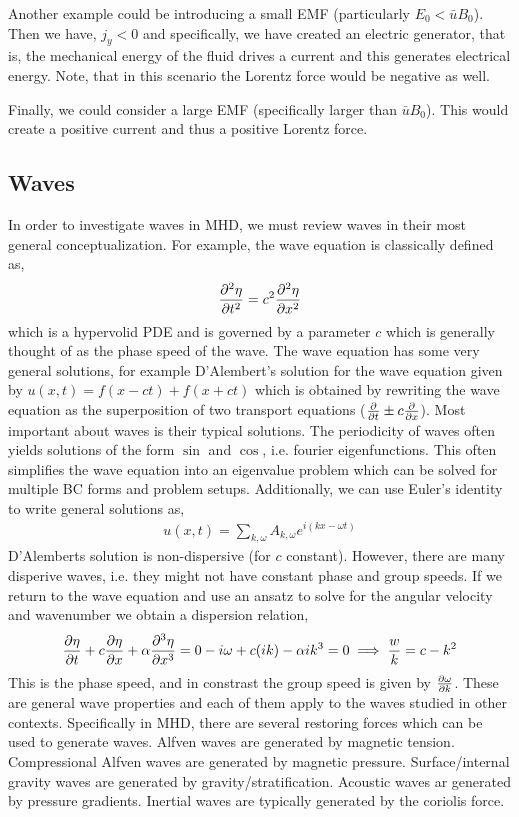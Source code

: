 \documentclass{article}
\begin{document}
Another example could be introducing a small EMF (particularly $E_0 <
\bar{u}B_0$). Then we have, $j_y < 0$ and specifically, we have created an
electric generator, that is, the mechanical energy of the fluid drives a current
and this generates electrical energy. Note, that in this scenario the Lorentz
force would be negative as well. 

Finally, we could consider a large EMF (specifically larger than $\bar{u}B_0$).
This would create a positive current and thus a positive Lorentz force. 

\subsection{Waves}
In order to investigate waves in MHD, we must review waves in their most general
conceptualization. For example, the wave equation is classically defined as, 
\begin{gather*}
    \frac{\partial^2 \eta}{\partial t^2} = c^2\frac{\partial^2 \eta}{\partial x^2}
\end{gather*}
which is a hypervolid PDE and is governed by a parameter $c$ which is generally
thought of as the phase speed of the wave. The wave equation has some very
general solutions, for example D'Alembert's solution for the wave equation given
by $u(x,t) = f(x-ct) + f(x + ct)$ which is obtained by rewriting the wave
equation as the superposition of two transport equations ($\frac{\partial }{\partial t} \pm c\frac{\partial }{\partial x}$).
Most important about waves is their typical solutions. The periodicity of waves
often yields solutions of the form $\sin$ and $\cos$, i.e. fourier
eigenfunctions. This often simplifies the wave equation into an eigenvalue
problem which can be solved for multiple BC forms and problem setups.
Additionally, we can use Euler's identity to write general solutions as, 
\begin{gather*}
    u(x,t) = \sum_{k,\omega} A_{k,\omega}e^{i(kx - \omega t)}
\end{gather*}
D'Alemberts solution is non-dispersive (for $c$ constant). However, there are
many disperive waves, i.e. they might not have constant phase and group speeds.
If we return to the wave equation and use an ansatz to solve for the angular
velocity and wavenumber we obtain a dispersion relation, 
\begin{gather*}
    \frac{\partial \eta}{\partial t} + c\frac{\partial \eta}{\partial x} +\alpha\frac{\partial ^3\eta}{\partial x^3} = 0
    -i\omega + c(ik) - \alpha ik^3 = 0 \implies \frac{w}{k} = c - k^2
\end{gather*}
This is the phase speed, and in constrast the group speed is given by
$\frac{\partial \omega}{\partial k}$. These are general wave properties and each of them apply to
the waves studied in other contexts. Specifically in MHD, there are several
restoring forces which can be used to generate waves. Alfven waves are generated
by magnetic tension. Compressional Alfven waves are generated by magnetic
pressure. Surface/internal gravity waves are generated by
gravity/stratification. Acoustic waves ar generated by pressure gradients.
Inertial waves are typically generated by the coriolis force. 
\end{document}
